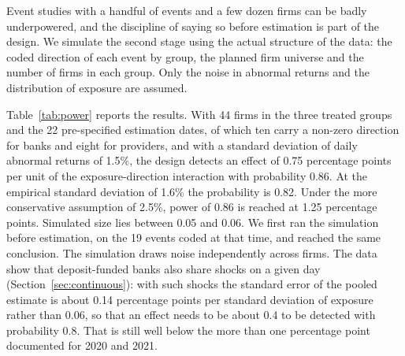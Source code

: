 \documentclass[11pt]{article}
\theoremstyle{plain}\newtheorem{proposition}{Proposition}
\begin{document}
Event studies with a handful of events and a few dozen firms can be badly underpowered, and the discipline of saying so before estimation is part of the design. We simulate the second stage using the actual structure of the data: the coded direction of each event by group, the planned firm universe and the number of firms in each group. Only the noise in abnormal returns and the distribution of exposure are assumed.

Table~\ref{tab:power} reports the results. With 44 firms in the three treated groups and the 22 pre-specified estimation dates, of which ten carry a non-zero direction for banks and eight for providers, and with a standard deviation of daily abnormal returns of 1.5\%, the design detects an effect of 0.75 percentage points per unit of the exposure-direction interaction with probability 0.86. At the empirical standard deviation of 1.6\% the probability is 0.82. Under the more conservative assumption of 2.5\%, power of 0.86 is reached at 1.25 percentage points. Simulated size lies between 0.05 and 0.06. We first ran the simulation before estimation, on the 19 events coded at that time, and reached the same conclusion. The simulation draws noise independently across firms. The data show that deposit-funded banks also share shocks on a given day (Section~\ref{sec:continuous}): with such shocks the standard error of the pooled estimate is about 0.14 percentage points per standard deviation of exposure rather than 0.06, so that an effect needs to be about 0.4 to be detected with probability 0.8. That is still well below the more than one percentage point documented for 2020 and 2021.
\end{document}
